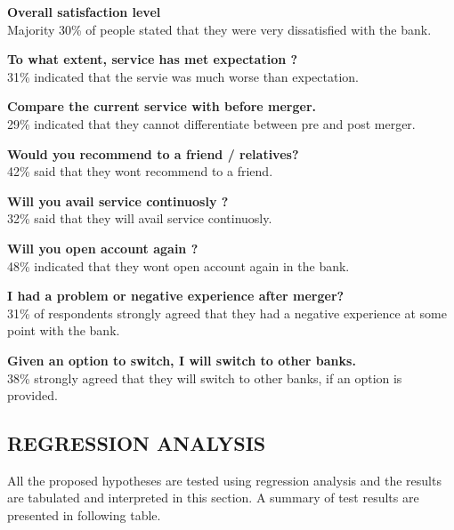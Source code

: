 \documentclass[a4paper, 12pt]{extarticle}
\begin{document}
{\par \textbf{ Overall satisfaction level}  \\
Majority 30\% of people stated that they were very dissatisfied with the bank. \\

\par \textbf{ To what extent, service has met expectation ?}  \\
31\% indicated that the servie was much worse than expectation. \\

\par \textbf{ Compare the current service with before merger.}  \\
29\% indicated that they cannot differentiate between pre and post merger. \\

\par \textbf{ Would you recommend to a friend / relatives?}  \\
42\% said that they wont recommend to a friend. \\

\par \textbf{ Will you avail service continuosly ?}  \\
32\% said that they will avail service continuosly. \\

\par \textbf{ Will you open account again ?} \\
48\% indicated that they wont open account again in the bank.

\par \textbf{ I had a problem or negative experience after merger?}  \\
31\% of respondents strongly agreed that they had a negative experience at some point with the bank.\\

\par \textbf{ Given an option to switch, I will switch to other banks.} \\
38\% strongly agreed that they will switch to other banks, if an option is provided.



\subsection{REGRESSION ANALYSIS}
All the proposed hypotheses are tested using regression analysis and the results are tabulated and interpreted in this section. A summary of test results are presented in following table.

}
\end{document}
